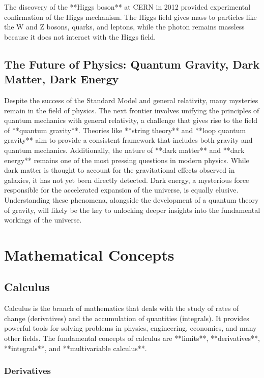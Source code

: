 \documentclass{article}
\begin{document}
The discovery of the **Higgs boson** at CERN in 2012 provided experimental confirmation of the Higgs mechanism. The Higgs field gives mass to particles like the W and Z bosons, quarks, and leptons, while the photon remains massless because it does not interact with the Higgs field.


\subsection{The Future of Physics: Quantum Gravity, Dark Matter, Dark Energy}

Despite the success of the Standard Model and general relativity, many mysteries remain in the field of physics. The next frontier involves unifying the principles of quantum mechanics with general relativity, a challenge that gives rise to the field of **quantum gravity**. Theories like **string theory** and **loop quantum gravity** aim to provide a consistent framework that includes both gravity and quantum mechanics. Additionally, the nature of **dark matter** and **dark energy** remains one of the most pressing questions in modern physics. While dark matter is thought to account for the gravitational effects observed in galaxies, it has not yet been directly detected. Dark energy, a mysterious force responsible for the accelerated expansion of the universe, is equally elusive. Understanding these phenomena, alongside the development of a quantum theory of gravity, will likely be the key to unlocking deeper insights into the fundamental workings of the universe.


\section{Mathematical Concepts}

\subsection{Calculus}

Calculus is the branch of mathematics that deals with the study of rates of change (derivatives) and the accumulation of quantities (integrals). It provides powerful tools for solving problems in physics, engineering, economics, and many other fields. The fundamental concepts of calculus are **limits**, **derivatives**, **integrals**, and **multivariable calculus**.

\subsubsection*{Derivatives}
\end{document}

